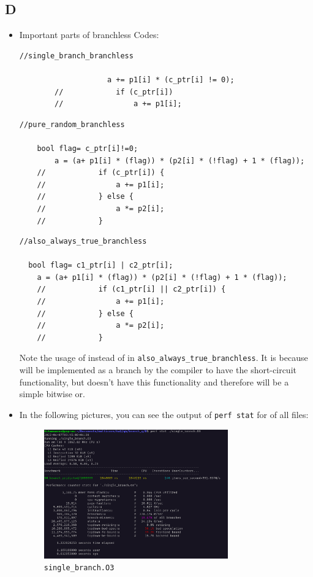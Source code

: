 \documentclass[12pt]{article}
\begin{document}
	\subsection{D}
	\begin{itemize}
	\item 
	
	Important parts of branchless Codes:
	
	
	\begin{lstlisting}[style=CStyle]
		//single_branch_branchless
		
		            a += p1[i] * (c_ptr[i] != 0);
		//            if (c_ptr[i])
		//                a += p1[i];
	\end{lstlisting}
	
	
		\begin{lstlisting}[style=CStyle]
		//pure_random_branchless
		
    bool flag= c_ptr[i]!=0;
		a = (a+ p1[i] * (flag)) * (p2[i] * (!flag) + 1 * (flag));
	//            if (c_ptr[i]) {
	//                a += p1[i];
	//            } else {
	//                a *= p2[i];
	//            }
	\end{lstlisting}
	


	
\begin{lstlisting}[style=CStyle]
	//also_always_true_branchless
	
  bool flag= c1_ptr[i] | c2_ptr[i];
	a = (a+ p1[i] * (flag)) * (p2[i] * (!flag) + 1 * (flag));
	//            if (c1_ptr[i] || c2_ptr[i]) {
	//                a += p1[i];
	//            } else {
	//                a *= p2[i];
	//            }
\end{lstlisting}

Note the usage of \codeword{|} instead of \codeword{||} in \Verb+also_always_true_branchless+. It is because \codeword{||} will be implemented as a branch by the compiler to have the short-circuit functionality, but \codeword{|} doesn't have this functionality and therefore will be a simple bitwise or.

\item 
In the following pictures, you can see the output of \Verb+perf stat+ for of all files:

\begin{figure}[H]
	\centering
	\includegraphics[width=0.75\textwidth]{./images/4D/single-branch.png}	
	\cprotect\caption{\Verb+single_branch.O3+}
\end{figure}



\end{itemize}
\end{document}
